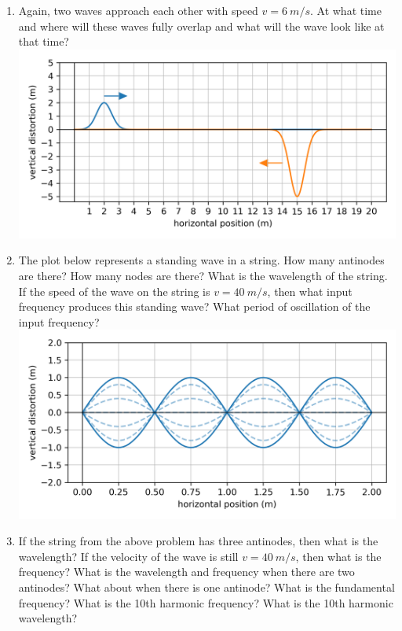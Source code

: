 \begin{enumerate}
	\item
	Again, two waves approach each other with speed $v=\SI{6}{m/s}$. At what time and where will these waves fully overlap and what will the wave look like at that time?\\
	\includegraphics[scale=1]{week13-plot-invert-gauss-pulse.png}
	
	\vspace{-3cm}
	\item
	The plot below represents a standing wave in a string. How many antinodes are there? How many nodes are there? What is the wavelength of the string. If the speed of the wave on the string is $v=\SI{40}{m/s}$, then what input frequency produces this standing wave? What period of oscillation of the input frequency? \\
	\includegraphics[scale=1]{week13-plot-standing-wave-1.png}
	
	\item
	If the string from the above problem has three antinodes, then what is the wavelength? If the velocity of the wave is still $v=\SI{40}{m/s}$, then what is the frequency? What is the wavelength and frequency when there are two antinodes? What about when there is one antinode? What is the fundamental frequency? What is the 10th harmonic frequency? What is the 10th harmonic wavelength?\bigskip
	

\end{enumerate}
